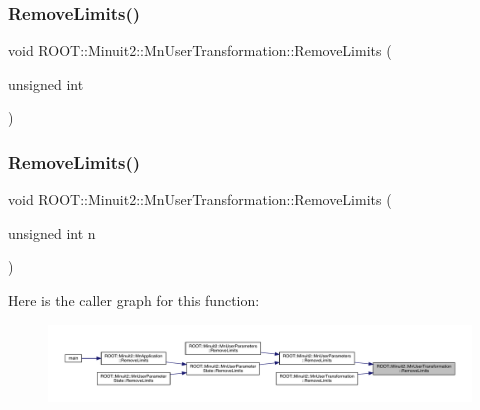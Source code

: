 \subsubsection{\texorpdfstring{RemoveLimits()}{RemoveLimits()}\hspace{0.1cm}{\footnotesize\ttfamily [1/6]}}
{\footnotesize\ttfamily void R\+O\+O\+T\+::\+Minuit2\+::\+Mn\+User\+Transformation\+::\+Remove\+Limits (\begin{DoxyParamCaption}\item[{unsigned int}]{ }\end{DoxyParamCaption})}

\mbox{\label{classROOT_1_1Minuit2_1_1MnUserTransformation_aa7b791dee11011a7442e44c85c06d650}} 
\subsubsection{\texorpdfstring{RemoveLimits()}{RemoveLimits()}\hspace{0.1cm}{\footnotesize\ttfamily [2/6]}}
{\footnotesize\ttfamily void R\+O\+O\+T\+::\+Minuit2\+::\+Mn\+User\+Transformation\+::\+Remove\+Limits (\begin{DoxyParamCaption}\item[{unsigned int}]{n }\end{DoxyParamCaption})}

Here is the caller graph for this function\+:
\nopagebreak
\begin{figure}[H]
\begin{center}
\leavevmode
\includegraphics[width=350pt]{d9/d98/classROOT_1_1Minuit2_1_1MnUserTransformation_aa7b791dee11011a7442e44c85c06d650_icgraph}
\end{center}
\end{figure}
\mbox{\label{classROOT_1_1Minuit2_1_1MnUserTransformation_aa7b791dee11011a7442e44c85c06d650}} 
